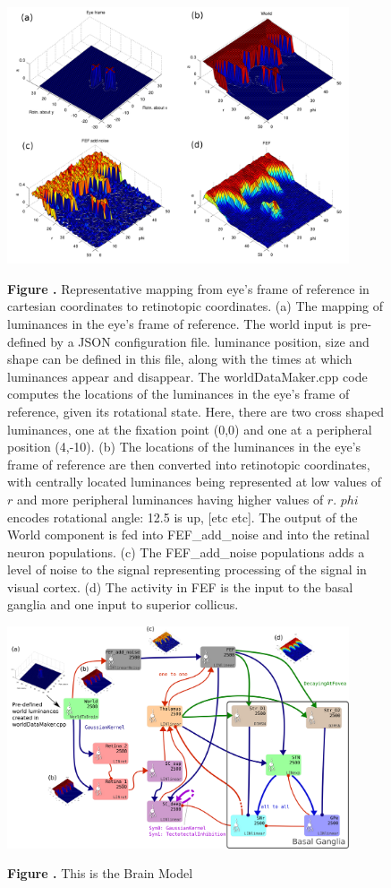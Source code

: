 \documentclass{frontiersSCNS}
\begin{document}
\begin{figure}[htb!]
\begin{center}
\includegraphics[width=0.9\textwidth]{./figures/mapping.png}
\end{center}
\textbf{\label{mapping} Figure .}
{ Representative mapping from eye's frame of reference in cartesian
coordinates to retinotopic coordinates. (a) The mapping of luminances
in the eye's frame of reference. The world input is pre-defined by a
JSON configuration file. luminance position, size and shape can be
defined in this file, along with the times at which luminances appear
and disappear. The worldDataMaker.cpp code computes the locations of
the luminances in the eye's frame of reference, given its rotational
state. Here, there are two cross shaped luminances, one at the
fixation point (0,0) and one at a peripheral position (4,-10). (b) The
locations of the luminances in the eye's frame of reference are then
converted into retinotopic coordinates, with centrally located
luminances being represented at low values of $r$ and more peripheral
luminances having higher values of $r$. $phi$ encodes rotational
angle: 12.5 is up, [etc etc]. The output of the World component is fed
into FEF\_add\_noise and into the retinal neuron populations. (c) The
FEF\_add\_noise populations adds a level of noise to the signal
representing processing of the signal in visual cortex. (d) The
activity in FEF is the input to the basal ganglia and one input to
superior collicus.}
\end{figure}

\begin{figure}[htb!]
\begin{center}
\includegraphics[width=0.9\textwidth]{./figures/Brain_Model.png}
\end{center}
\textbf{\label{brain_model} Figure .}
{ This is the Brain Model}
\end{figure}
\end{document}
